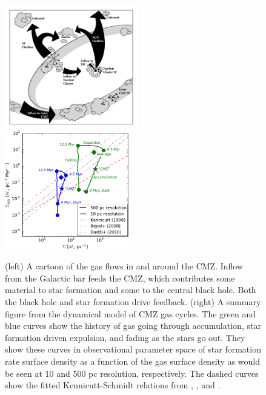 \documentclass[modern]{aastex62}
\begin{document}
\begin{figure}[htp]
    \includegraphics[width=0.52\textwidth]{White_paper_v4.1.pdf}
    \includegraphics[width=0.48\textwidth]{Krumholz2015_fig16left.pdf}
    \caption{(left) A cartoon of the gas flows in and around the CMZ.
    Inflow from the Galactic bar feeds the CMZ, which contributes
    some material to star formation and some to the central black hole.
    Both the black hole and star formation drive feedback. (right)
    A summary figure from the \citet{Krumholz2015b} dynamical model
    of CMZ gas cycles.  The green and blue curves show the history
    of gas going through accumulation, star formation driven expulsion,
    and fading as the stars go out.  They show these curves in observational
    parameter space of star formation rate surface density as a function of the gas surface density as would be seen at 10 and 500 pc resolution, respectively.
    The dashed curves show the fitted Kennicutt-Schmidt relations
    from \citet{Kennicutt1998a}, \citet{Bigiel2008a}, and \citet{Daddi2010a}.}
\end{figure}
\end{document}
